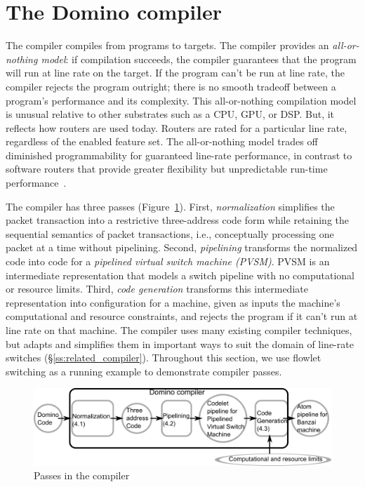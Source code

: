 \section{The Domino compiler}
\label{s:compiler}

The \pktlanguage compiler compiles from \pktlanguage programs to \absmachine
targets. The compiler provides an {\em all-or-nothing model}: if compilation
succeeds, the compiler guarantees that the program will run at line rate on the
target. If the program can't be run at line rate, the compiler rejects the
program outright; there is no smooth tradeoff between a program's performance
and its complexity.  This all-or-nothing compilation model is unusual relative
to other substrates such as a CPU, GPU, or DSP. But, it reflects how routers
are used today. Routers are rated for a particular line rate, regardless of the
enabled feature set. The all-or-nothing model trades off diminished
programmability for guaranteed line-rate performance, in contrast to software
routers that provide greater flexibility but unpredictable run-time
performance~\cite{dobrescu2012, wenfei15}.

The \pktlanguage compiler has three passes (Figure~\ref{fig:passes}).  First,
\textit{normalization} simplifies the packet transaction into a restrictive
three-address code form while retaining the sequential semantics of packet
transactions, i.e., conceptually processing one packet at a time without
pipelining. Second, \textit{pipelining} transforms the normalized code into
code for a \textit{pipelined virtual switch machine (PVSM)}. PVSM is an
intermediate representation that models a switch pipeline with no computational
or resource limits. Third, \textit{code generation} transforms this
intermediate representation into configuration for a \absmachine machine, given
as inputs the machine's computational and resource constraints, and rejects the
program if it can't run at line rate on that \absmachine machine.  The
\pktlanguage compiler uses many existing compiler techniques, but adapts and
simplifies them in important ways to suit the domain of line-rate switches
(\S\ref{ss:related_compiler}). Throughout this section, we use flowlet
switching as a running example to demonstrate compiler passes.

\begin{figure}[!t]
  \includegraphics[width=\columnwidth]{compiler.pdf}
  \caption{Passes in the \pktlanguage compiler}
  \label{fig:passes}
\end{figure}

